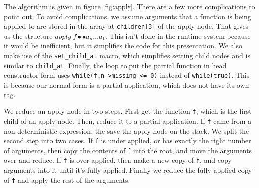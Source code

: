 \documentclass{book}
\theoremstyle{definition}
\newcommand{\Varid}[1]{\mathit{#1}}
\begin{document}
The algorithm is given in figure \ref{fig:apply}.
There are a few more complications to point out.
To avoid complications, we assume arguments that a function is being applied to are stored in the
array at \texttt{children[3]} of the apply node.
That gives us the structure \ensuremath{\Varid{apply}\;\Varid{f}\bullet \bullet \Varid{a}_{\Varid{n}}\ldots \Varid{a}_{\mathrm{1}}}.
This isn't done in the runtime system because it would be inefficient,
but it simplifies the code for this presentation.
We also make use of the \texttt{set\_child\_at} macro, which simplifies setting child nodes
and is similar to \texttt{child\_at}.
Finally, the loop to put the partial function in head constructor form uses
\texttt{while(f.n->missing <= 0)} instead of \texttt{while(true)}.
This is because our normal form is a partial application, which does not have its own tag.

We reduce an apply node in two steps.
First get the function \texttt f, which is the first child of an apply node.
Then, reduce it to a partial application.
If \texttt f came from a non-deterministic expression, the save the apply node on the stack.
We split the second step into two cases.
If \texttt f is under applied, or has exactly the right number of arguments,
then copy the contents of \texttt f into the root, and move the arguments over and reduce.
If \texttt f is over applied, then make a new copy of \texttt f,
and copy arguments into it until it's fully applied.
Finally we reduce the fully applied copy of \texttt f and apply the rest of the arguments.
\end{document}
